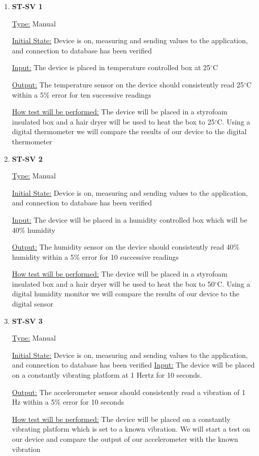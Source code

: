 \documentclass[12pt, titlepage]{article}
\begin{document}
\begin{enumerate}

\item{\bf{ST-SV 1}}

\underline{Type:} Manual
					
\underline{Initial State:} Device is on, measuring and sending values to the application, and connection to database has been verified
					
\underline{Input:} The device is placed in temperature controlled box at 25$^{\circ}$C
					
\underline{Output:} The temperature sensor on the device should consistently read 25$^{\circ}$C within a 5\% error for ten successive readings 

					
\underline{How test will be performed:} The device will be placed in a styrofoam insulated box and a hair dryer will be used to heat the box to 25$^{\circ}$C. Using a digital thermometer we will compare the results of our device to the digital thermometer\\

		
\item{\bf{ST-SV 2}}

\underline{Type:} Manual
					
\underline{Initial State:} Device is on, measuring and sending values to the application, and connection to database has been verified
					
\underline{Input:} The device will be placed in a humidity controlled box which will be 40\% humidity
					
\underline{Output:} The humidity sensor on the device should consistently read 40\% humidity within a 5\% error for 10 successive readings

\underline{How test will be performed:} The device will be placed in a styrofoam insulated box and a hair dryer will be used to heat the box to 50$^{\circ}$C. Using a digital humidity monitor we will compare the results of our device to the digital sensor

\item{\bf{ST-SV 3}}

\underline{Type:} Manual
					
\underline{Initial State:} Device is on, measuring and sending values to the application, and connection to database has been verified
\underline{Input:} The device will be placed on a constantly vibrating platform at 1 Hertz for 10 seconds.
					
\underline{Output:} The accelerometer sensor should consistently read a vibration of 1 Hz within a 5\% error for 10 seconds

\underline{How test will be performed:} The device will be placed on a constantly vibrating platform which is set to a known vibration. We will start a test on our device and compare the output of our accelerometer with the known vibration

\end{enumerate}
\end{document}
